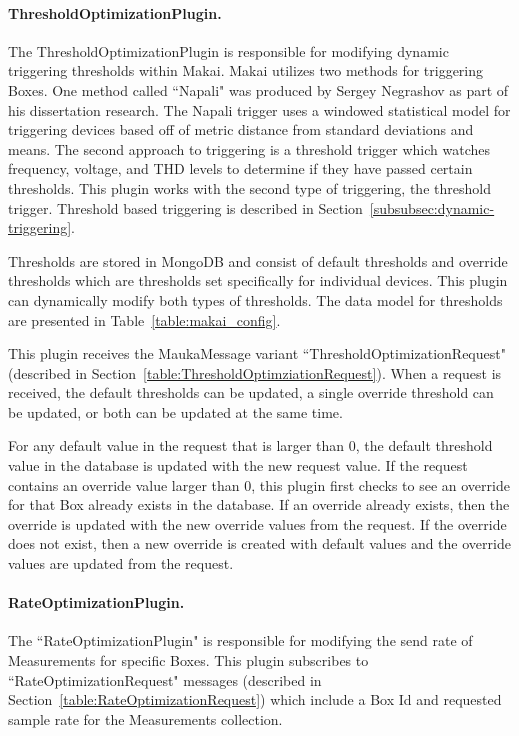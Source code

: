 \paragraph{ThresholdOptimizationPlugin.}\label{subsubsec:threshold-optimization-pugin}
The ThresholdOptimizationPlugin is responsible for modifying dynamic triggering thresholds within Makai. Makai utilizes two methods for triggering Boxes. One method called ``Napali" was produced by Sergey Negrashov as part of his dissertation research. The Napali trigger uses a windowed statistical model for triggering devices based off of metric distance from standard deviations and means. The second approach to triggering is a threshold trigger which watches frequency, voltage, and THD levels to determine if they have passed certain thresholds. This plugin works with the second type of triggering, the threshold trigger. Threshold based triggering is described in Section~\ref{subsubsec:dynamic-triggering}.

Thresholds are stored in MongoDB and consist of default thresholds and override thresholds which are thresholds set specifically for individual devices. This plugin can dynamically modify both types of thresholds. The data model for thresholds are presented in Table~\ref{table:makai_config}.

This plugin receives the MaukaMessage variant ``ThresholdOptimizationRequest" (described in Section~\ref{table:ThresholdOptimziationRequest}). When a request is received, the default thresholds can be updated, a single override threshold can be updated, or both can be updated at the same time.

For any default value in the request that is larger than 0, the default threshold value in the database is updated with the new request value. If the request contains an override value larger than 0, this plugin first checks to see an override for that Box already exists in the database. If an override already exists, then the override is updated with the new override values from the request. If the override does not exist, then a new override is created with default values and the override values are updated from the request.

\paragraph{RateOptimizationPlugin.}

The ``RateOptimizationPlugin" is responsible for modifying the send rate of Measurements for specific Boxes. This plugin subscribes to ``RateOptimizationRequest" messages (described in Section~\ref{table:RateOptimizationRequest}) which include a Box Id and requested sample rate for the Measurements collection.

